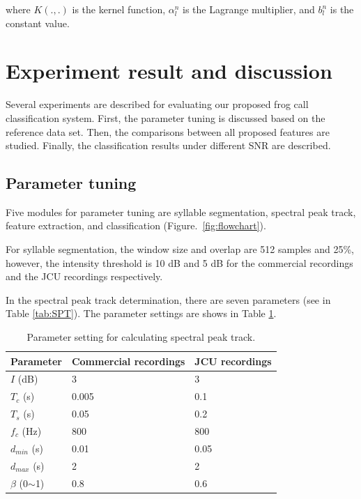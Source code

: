 where $K(.,.)$ is the kernel function, $\alpha_{l}^{n}$ is the Lagrange multiplier, and $b_{l}^{n}$ is the constant value. 
\section{Experiment result and discussion}
Several experiments are described for evaluating our proposed frog call classification system. First, the parameter tuning is discussed based on the reference data set. Then, the comparisons between all proposed features are studied. Finally, the classification results under different SNR are described.

\subsection{Parameter tuning}
Five modules for parameter tuning are syllable segmentation, spectral peak track, feature extraction, and classification (Figure.~\ref{fig:flowchart}). 

For syllable segmentation, the window size and overlap are 512 samples and 25\%, however, the intensity threshold is 10 dB and 5 dB for the commercial recordings and the JCU recordings respectively.


In the spectral peak track determination, there are seven parameters (see in Table \ref{tab:SPT}). The parameter settings are shows in Table \ref{tab:value}.
\begin{table}[htb!]
\centering
\caption{Parameter setting for calculating spectral peak track.}
\label{tab:value}
\begin{tabular}{lll}
\hline
\textbf{Parameter} & \textbf{Commercial recordings} & \textbf{JCU recordings} \\ \hline\hline
   $I$ (dB)        & 3             & 3             \\ 
    $T_{c}$ (s)        & 0.005         & 0.1           \\ 
  $T_{s}$ (s)        & 0.05          & 0.2           \\ 
      $f_{c}$ (Hz)        & 800           & 800           \\ 
   $d_{min}$ (s)         & 0.01          & 0.05          \\ 
     $d_{max}$ (s)        & 2             & 2             \\ 
     $\beta$ (0$\sim$1)          & 0.8           & 0.6           \\ \hline\hline
\end{tabular}
\end{table}
                              

